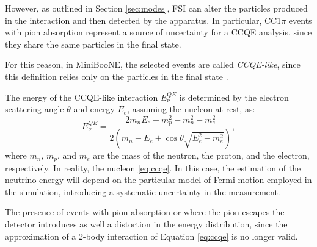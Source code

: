 However, as outlined in Section \ref{sec:modes}, FSI can alter the particles produced in the interaction and then detected by the apparatus. In particular, CC1$\pi$ events with pion absorption represent a source of uncertainty for a CCQE analysis, since they share the same particles in the final state.

For this reason, in MiniBooNE, the selected events are called \emph{CCQE-like}, since this definition relies only on the particles in the final state \cite{Katori:2013nca}. 

The energy of the CCQE-like interaction $E_{\nu}^{QE}$ is determined by the electron scattering angle $\theta$ and energy $E_e$, assuming the nucleon at rest, as:
\begin{equation}
    E_{\nu}^{QE} = \frac{2m_n E_e + m_p^2- m_n^2 - m_e^2}{2(m_n - E_e + \cos\theta\sqrt{E_e^2-m_e^2})},\label{eq:ccqe}
\end{equation}
where $m_n$, $m_p$, and $m_e$ are the mass of the neutron, the proton, and the electron, respectively. 
In reality, the nucleon  \ref{eq:ccqe}. In this case, the estimation of the neutrino energy will depend on the particular model of Fermi motion employed in the simulation, introducing a systematic uncertainty in the measurement.

The presence of events with pion absorption or where the pion escapes the detector introduces as well a distortion in the energy distribution, since the approximation of a 2-body interaction of Equation \ref{eq:ccqe} is no longer valid.


